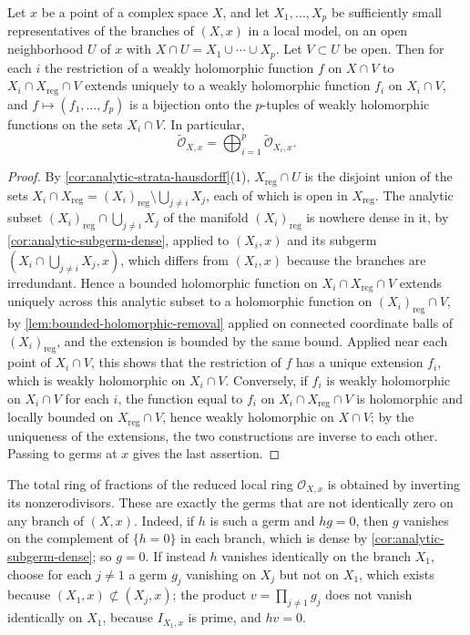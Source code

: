 \begin{lemma}\label{lem:weakly-holomorphic-branches}
Let $x$ be a point of a complex space $X$, and let $X_1,\ldots,X_p$ be sufficiently small representatives of the branches of $(X,x)$ in a local model, on an open neighborhood $U$ of $x$ with $X\cap U=X_1\cup\cdots\cup X_p$. Let $V\subset U$ be open. Then for each $i$ the restriction of a weakly holomorphic function $f$ on $X\cap V$ to $X_i\cap X_{\mathrm{reg}}\cap V$ extends uniquely to a weakly holomorphic function $f_i$ on $X_i\cap V$, and $f\mapsto(f_1,\ldots,f_p)$ is a bijection onto the $p$-tuples of weakly holomorphic functions on the sets $X_i\cap V$. In particular,
\[
 \widetilde{\mathcal O}_{X,x}=\bigoplus_{i=1}^p\widetilde{\mathcal O}_{X_i,x}.
\]
\end{lemma}
\begin{proof}
By \cref{cor:analytic-strata-hausdorff}(1), $X_{\mathrm{reg}}\cap U$ is the disjoint union of the sets $X_i\cap X_{\mathrm{reg}}=(X_i)_{\mathrm{reg}}\setminus\bigcup_{j\neq i}X_j$, each of which is open in $X_{\mathrm{reg}}$. The analytic subset $(X_i)_{\mathrm{reg}}\cap\bigcup_{j\neq i}X_j$ of the manifold $(X_i)_{\mathrm{reg}}$ is nowhere dense in it, by \cref{cor:analytic-subgerm-dense}, applied to $(X_i,x)$ and its subgerm $(X_i\cap\bigcup_{j\neq i}X_j,x)$, which differs from $(X_i,x)$ because the branches are irredundant. Hence a bounded holomorphic function on $X_i\cap X_{\mathrm{reg}}\cap V$ extends uniquely across this analytic subset to a holomorphic function on $(X_i)_{\mathrm{reg}}\cap V$, by \cref{lem:bounded-holomorphic-removal} applied on connected coordinate balls of $(X_i)_{\mathrm{reg}}$, and the extension is bounded by the same bound. Applied near each point of $X_i\cap V$, this shows that the restriction of $f$ has a unique extension $f_i$, which is weakly holomorphic on $X_i\cap V$. Conversely, if $f_i$ is weakly holomorphic on $X_i\cap V$ for each $i$, the function equal to $f_i$ on $X_i\cap X_{\mathrm{reg}}\cap V$ is holomorphic and locally bounded on $X_{\mathrm{reg}}\cap V$, hence weakly holomorphic on $X\cap V$; by the uniqueness of the extensions, the two constructions are inverse to each other. Passing to germs at $x$ gives the last assertion.
\end{proof}

The total ring of fractions of the reduced local ring $\mathcal O_{X,x}$ is obtained by inverting its nonzerodivisors. These are exactly the germs that are not identically zero on any branch of $(X,x)$. Indeed, if $h$ is such a germ and $hg=0$, then $g$ vanishes on the complement of $\{h=0\}$ in each branch, which is dense by \cref{cor:analytic-subgerm-dense}; so $g=0$. If instead $h$ vanishes identically on the branch $X_1$, choose for each $j\neq1$ a germ $g_j$ vanishing on $X_j$ but not on $X_1$, which exists because $(X_1,x)\not\subset(X_j,x)$; the product $v=\prod_{j\neq1}g_j$ does not vanish identically on $X_1$, because $I_{X_1,x}$ is prime, and $hv=0$.

